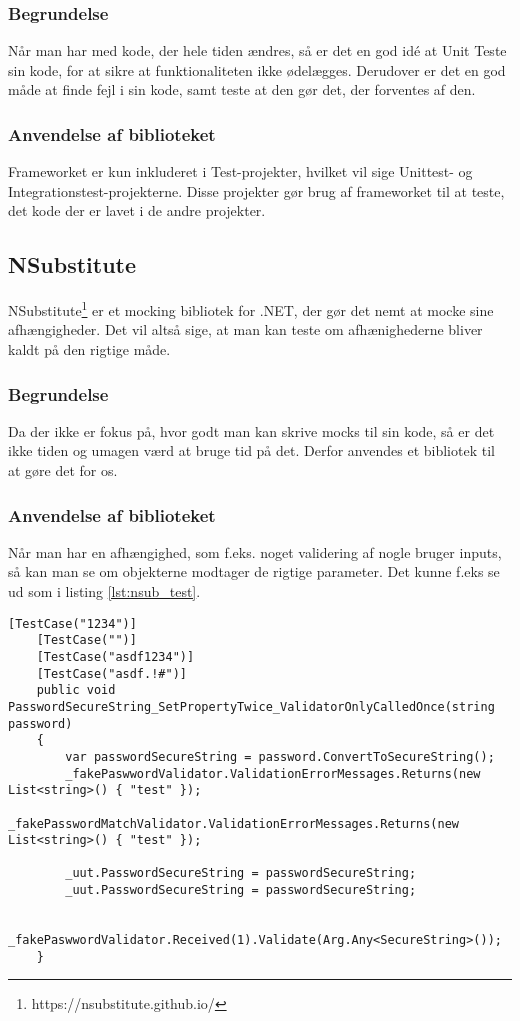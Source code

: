 \documentclass[Implementering/Implementering_main.tex]{subfiles}
\begin{document}
\subsubsection{Begrundelse}
Når man har med kode, der hele tiden ændres, så er det en god idé at Unit Teste sin kode, for at sikre at funktionaliteten ikke ødelægges. Derudover er det en god måde at finde fejl i sin kode, samt teste at den gør det, der forventes af den.
\subsubsection{Anvendelse af biblioteket}
Frameworket er kun inkluderet i Test-projekter, hvilket vil sige Unittest- og Integrationstest-projekterne. Disse projekter gør brug af frameworket til at teste, det kode der er lavet i de andre projekter.

\subsection{NSubstitute}
NSubstitute\footnote{https://nsubstitute.github.io/} er et mocking bibliotek for .NET, der gør det nemt at mocke sine afhængigheder. Det vil altså sige, at man kan teste om afhænighederne bliver kaldt på den rigtige måde. 
\subsubsection{Begrundelse}
Da der ikke er fokus på, hvor godt man kan skrive mocks til sin kode, så er det ikke tiden og umagen værd at bruge tid på det. Derfor anvendes et bibliotek til at gøre det for os.
\subsubsection{Anvendelse af biblioteket}
Når man har en afhængighed, som f.eks. noget validering af nogle bruger inputs, så kan man se om objekterne modtager de rigtige parameter. Det kunne f.eks se ud som i listing  \ref{lst:nsub_test}.
\begin{lstlisting}[caption={Oprettelse af en side med tilhørende ViewModel}, label={lst:nsub_test},style=customc]
    [TestCase("1234")]
    [TestCase("")]
    [TestCase("asdf1234")]
    [TestCase("asdf.!#")]
    public void PasswordSecureString_SetPropertyTwice_ValidatorOnlyCalledOnce(string password)
    {
        var passwordSecureString = password.ConvertToSecureString();
        _fakePaswwordValidator.ValidationErrorMessages.Returns(new List<string>() { "test" });
        _fakePasswordMatchValidator.ValidationErrorMessages.Returns(new List<string>() { "test" });

        _uut.PasswordSecureString = passwordSecureString;
        _uut.PasswordSecureString = passwordSecureString;

        _fakePaswwordValidator.Received(1).Validate(Arg.Any<SecureString>());
    }
\end{lstlisting}
\end{document}
